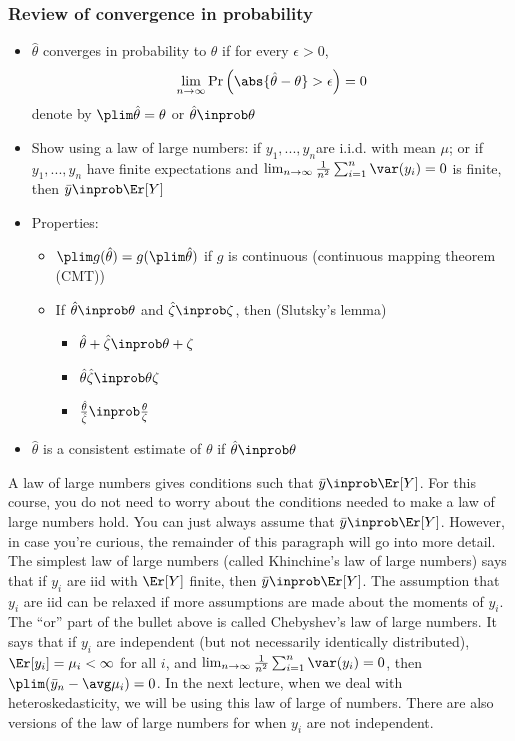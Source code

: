 \begin{frame}
  \frametitle{Review of convergence in probability}
  \begin{itemize}
  \item $\hat{\theta}$ \alert{converges in probability} to $\theta$ if for every
    $\epsilon > 0$, 
    \[ \lim_{n \to \infty} \Pr\left( \abs{\hat{\theta} - \theta} > \epsilon
    \right) = 0 \]
    denote by $\plim \hat{\theta} = \theta$ or $\hat{\theta} \inprob \theta$
  \item Show using a \alert{law of large numbers}: if
    $y_1, ..., y_n$are i.i.d. with mean $\mu$; or if $y_1, ..., y_n$
    have finite expectations and
    $\lim_{n \to \infty} \frac{1}{n^2}\sum_{i=1}^n \var(y_i) = 0$ is
    finite, then $ \bar{y} \inprob \Er[Y]$
  \item Properties:
    \begin{itemize}
    \item $\plim g(\hat{\theta}) = g(\plim \hat{\theta})$ if $g$ is continuous
      (\alert{continuous mapping theorem (CMT)})
    \item If $\hat{\theta} \inprob \theta$ and $\hat{\zeta} \inprob \zeta$, then
      (\alert{Slutsky's lemma})
      \begin{itemize} 
      \item $\hat{\theta} + \hat{\zeta} \inprob \theta + \zeta$
      \item $\hat{\theta} \hat{\zeta} \inprob \theta \zeta$
      \item $\frac{\hat{\theta}}{\hat{\zeta}} \inprob \frac{\theta}{\zeta}$
      \end{itemize}
    \end{itemize}
  \item $\hat{\theta}$ is a \alert{consistent} estimate of $\theta$ if $\hat{\theta}
    \inprob \theta$
  \end{itemize}
\end{frame}

A law of large numbers gives conditions such that
$\bar{y} \inprob \Er[Y]$. For this course, you do not need to worry
about the conditions needed to make a law of large numbers hold. You
can just always assume that $\bar{y} \inprob \Er[Y]$. However, in case
you're curious, the remainder of this paragraph will go into more detail.
The simplest law of large numbers (called
Khinchine's law of large numbers) says that if $y_i$ are iid with
$\Er[Y]$ finite, then $\bar{y} \inprob \Er[Y]$. The assumption that
$y_i$ are iid can be relaxed if more assumptions are made about the
moments of $y_i$. The ``or'' part of the bullet above is called
Chebyshev's law of large numbers. It says that if $y_i$ are
independent (but not necessarily identically distributed), $\Er[y_i] = \mu_i
< \infty$ for all $i$, and $\lim_{n \to \infty}
\frac{1}{n^2}\sum_{i=1}^n \var(y_i) = 0$, then $\plim (\bar{y}_n -
\avg \mu_i) = 0$. In the next lecture, when we deal with
heteroskedasticity, we will be using this law of large of
numbers. There are also versions of the law of large numbers for when
$y_i$ are not independent. 


